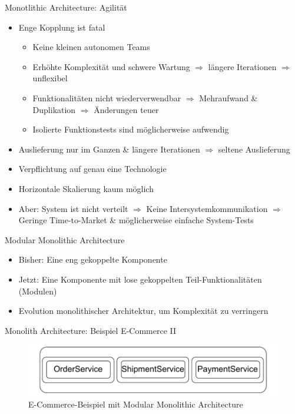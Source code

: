 \begin{frame}{Monotlithic Architecture: Agilität}
    \begin{itemize}
        \item Enge Kopplung ist fatal
        \begin{itemize}
            \item Keine kleinen autonomen Teams
            \item Erhöhte Komplexität und schwere Wartung $\Rightarrow$ längere Iterationen $\Rightarrow$ unflexibel
            \item Funktionalitäten nicht wiederverwendbar $\Rightarrow$ Mehraufwand \& Duplikation $\Rightarrow$ Änderungen teuer
            \item Isolierte Funktionstests sind möglicherweise aufwendig
        \end{itemize}
        \item Auslieferung nur im Ganzen \& längere Iterationen $\Rightarrow$ seltene Auslieferung
        \item Verpflichtung auf genau eine Technologie
        \item Horizontale Skalierung kaum möglich
        \item Aber: System ist nicht verteilt $\Rightarrow$ Keine Intersystemkommunikation $\Rightarrow$ Geringe Time-to-Market \& möglicherweise einfache System-Tests
    \end{itemize}
\end{frame}


\begin{frame}{Modular Monolithic Architecture}
    \begin{itemize}
       \item Bisher: Eine eng gekoppelte Komponente
       \item Jetzt: Eine Komponente mit lose gekoppelten Teil-Funktionalitäten (Modulen)
       \item Evolution monolithischer Architektur, um Komplexität zu verringern
     \end{itemize}
\end{frame}

\begin{frame}{Monolith Architecture: Beispiel E-Commerce II}
    \begin{figure}[!h]
        \centering
        \includegraphics[scale=0.70]{imglib/mono/mono-example}
        \caption{E-Commerce-Beispiel mit Modular Monolithic Architecture}
        \label{fig:mono-modular}
    \end{figure}
\end{frame}

